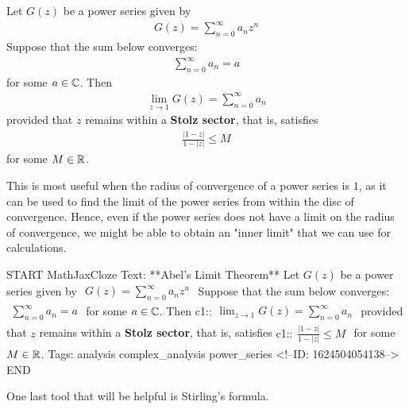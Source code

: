 \documentclass{memoir}
\begin{document}
\begin{thm}
	Let \(G(z)\) be a power series given by
	\begin{align*}
		G(z) = \sum_{n=0}^{\infty} a_n z^{n}
	\end{align*}
	Suppose that the sum below converges:
	\begin{align*}
		\sum_{n=0}^{\infty} a_n = a
	\end{align*}
	for some \(a \in \mathbb{C}\). Then
	\begin{align*}
		\lim_{z \to 1} G(z) = \sum_{n=0}^{\infty} a_n
	\end{align*}
	provided that \(z\) remains within a \textbf{Stolz sector}, that is, satisfies
	\begin{align*}
		\frac{\left| 1-z \right| }{1-\left| z \right| } \leq M
	\end{align*}
	for some \(M \in \mathbb{R}\).
\end{thm}
This is most useful when the radius of convergence of a power series is \(1\), as it can be used to find the limit of the power series from within the disc of convergence. Hence, even if the power series does not have a limit on the radius of convergence, we might be able to obtain an "inner limit" that we can use for calculations.

\begin{anki}
START
MathJaxCloze
Text: **Abel's Limit Theorem**
	Let \(G(z)\) be a power series given by
	\(\begin{align*}
	  	G(z) = \sum_{n=0}^{\infty} a_n z^{n}
	  \end{align*}\)
	Suppose that the sum below converges:
	\(\begin{align*}
	  	\sum_{n=0}^{\infty} a_n = a
	  \end{align*}\)
	for some \(a \in \mathbb{C}\). Then
	{{c1::\(\begin{align*}
	        	\lim_{z \to 1} G(z) = \sum_{n=0}^{\infty} a_n
	        \end{align*}\)}} 
	provided that \(z\) remains within a \textbf{Stolz sector}, that is, satisfies
	{{c1::\(\begin{align*}
	        	\frac{\left| 1-z \right| }{1-\left| z \right| } \leq M	
	        \end{align*}\)}} 
	for some \(M \in \mathbb{R}\).
Tags:  analysis complex_analysis power_series
<!--ID: 1624504054138-->
END
\end{anki}

One last tool that will be helpful is Stirling's formula.
\end{document}
